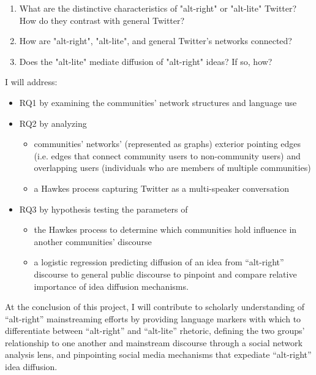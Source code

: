 \documentclass[acmlarge, screen, authorversion]{acmart}
\begin{document}
\begin{enumerate}[font={\bfseries},label={{RQ}\arabic*.}]
	\item What are the distinctive characteristics of "alt-right" or "alt-lite"
  Twitter? How do they contrast with general Twitter?

	\item How are "alt-right", "alt-lite", and general Twitter's networks
  connected?

	\item Does the "alt-lite" mediate diffusion of "alt-right" ideas? If so, how?
\end{enumerate}

I will address:
\begin{itemize}
	\item RQ1 by examining the communities’ network structures and language use
	\item RQ2 by analyzing
	      \begin{itemize}
	      	\item communities’ networks’ (represented as graphs) exterior pointing edges
	      	      (i.e. edges that connect community users to non-community users) and
	      	      overlapping users (individuals who are members of multiple communities)
	      	\item a Hawkes process capturing Twitter as a multi-speaker
	      	      conversation
	      \end{itemize}
	\item RQ3 by hypothesis testing the parameters of
	      \begin{itemize}
	      	\item the Hawkes
	      	      process to determine which communities hold influence in another
	      	      communities’ discourse
	      	\item a logistic regression predicting diffusion of an idea from
	      	      ``alt-right” discourse to general public discourse to pinpoint and compare relative importance of idea diffusion mechanisms.
	      \end{itemize}
\end{itemize}

At the conclusion of this project, I will contribute to scholarly understanding of ``alt-right''
mainstreaming efforts by providing language markers with which to differentiate between
``alt-right'' and ``alt-lite'' rhetoric, defining the two groups' relationship to one another and
mainstream discourse through a social network analysis lens, and pinpointing social media mechanisms
that expediate ``alt-right'' idea diffusion.
\end{document}
